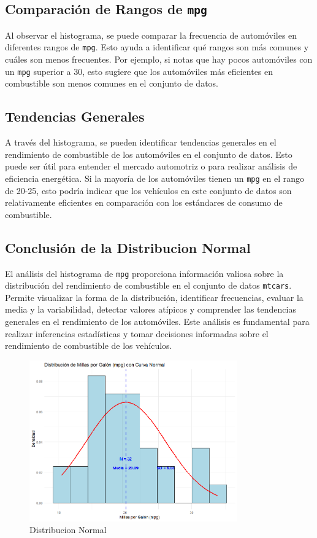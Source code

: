 \documentclass{article}
\begin{document}
\subsection{Comparación de Rangos de \texttt{mpg}}
Al observar el histograma, se puede comparar la frecuencia de automóviles en diferentes rangos de \texttt{mpg}. Esto ayuda a identificar qué rangos son más comunes y cuáles son menos frecuentes. Por ejemplo, si notas que hay pocos automóviles con un \texttt{mpg} superior a 30, esto sugiere que los automóviles más eficientes en combustible son menos comunes en el conjunto de datos.

\subsection{Tendencias Generales}
A través del histograma, se pueden identificar tendencias generales en el rendimiento de combustible de los automóviles en el conjunto de datos. Esto puede ser útil para entender el mercado automotriz o para realizar análisis de eficiencia energética. Si la mayoría de los automóviles tienen un \texttt{mpg} en el rango de 20-25, esto podría indicar que los vehículos en este conjunto de datos son relativamente eficientes en comparación con los estándares de consumo de combustible.

\subsection{Conclusión de la Distribucion Normal}
El análisis del histograma de \texttt{mpg} proporciona información valiosa sobre la distribución del rendimiento de combustible en el conjunto de datos \texttt{mtcars}. Permite visualizar la forma de la distribución, identificar frecuencias, evaluar la media y la variabilidad, detectar valores atípicos y comprender las tendencias generales en el rendimiento de los automóviles. Este análisis es fundamental para realizar inferencias estadísticas y tomar decisiones informadas sobre el rendimiento de combustible de los vehículos.
\begin{figure}[h] %
    \centering %
    \includegraphics[width=0.8\textwidth]{Image3.png}
    \caption{Distribucion Normal} %
    \label{fig:mi_imagen} %
\end{figure}
\end{document}
